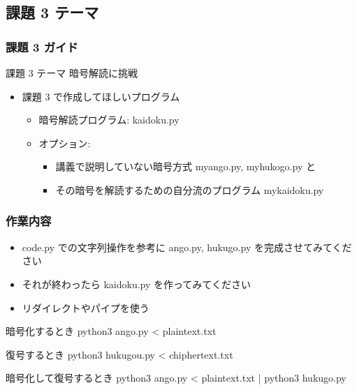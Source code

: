 \subsection{課題 3 テーマ}
\begin{frame}
\frametitle{課題 3 ガイド}
  \begin{block}{課題 3 テーマ}
暗号解読に挑戦
  \end{block}
  \begin{itemize}
\item 課題 3 で作成してほしいプログラム
    \begin{itemize}
\item 暗号解読プログラム: kaidoku.py
\item オプション:
      \begin{itemize}
\item 講義で説明していない暗号方式 myango.py, myhukogo.py と
\item その暗号を解読するための自分流のプログラム mykaidoku.py
      \end{itemize}
    \end{itemize}
  \end{itemize}
\end{frame}
\begin{frame}
\frametitle{作業内容}
  \begin{itemize}
\item code.py での文字列操作を参考に ango.py, hukugo.py を完成させてみてください
\item それが終わったら kaidoku.py を作ってみてください
\item リダイレクトやパイプを使う
  \end{itemize}
  \begin{itembox}{暗号化するとき}
 python3 ango.py < plaintext.txt
  \end{itembox}
  \begin{itembox}{復号するとき}
 python3 hukugou.py < chiphertext.txt
  \end{itembox}
  \begin{itembox}{暗号化して復号するとき}
 python3 ango.py < plaintext.txt | python3 hukugo.py
  \end{itembox}
\end{frame}
